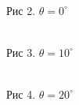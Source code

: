 \documentclass[12pt]{article}
\begin{document}
  \begin{figure}[h!]
    \begin{minipage}[h]{0.32\linewidth}
      \\
      Рис 2. $\theta = 0^{\circ}$
    \end{minipage}
    \begin{minipage}[h]{0.32\linewidth}
      \\
      Рис 3. $\theta = 10^{\circ}$
    \end{minipage}
    \begin{minipage}[h]{0.32\linewidth}
      \\
      Рис 4. $\theta = 20^{\circ}$
    \end{minipage}
  \end{figure}
\end{document}
